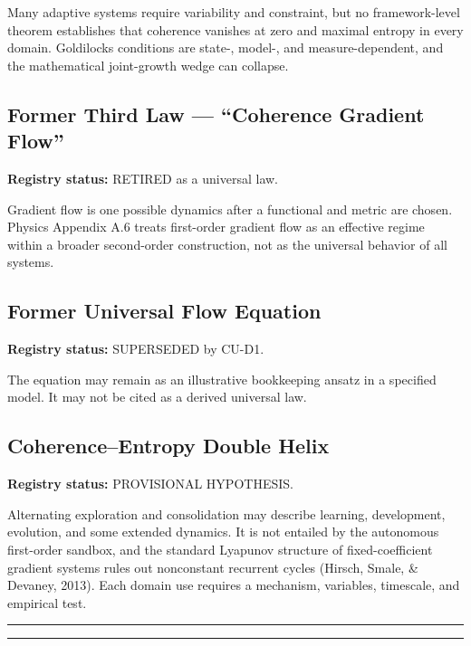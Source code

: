 \documentclass[
  11pt,
]{article}
\begin{document}
Many adaptive systems require variability and constraint, but no
framework-level theorem establishes that coherence vanishes at zero and
maximal entropy in every domain. Goldilocks conditions are state-,
model-, and measure-dependent, and the mathematical joint-growth wedge
can collapse.

\subsection{Former Third Law --- ``Coherence Gradient
Flow''}\label{former-third-law-coherence-gradient-flow}

\textbf{Registry status:} RETIRED as a universal law.

Gradient flow is one possible dynamics after a functional and metric are
chosen. Physics Appendix A.6 treats first-order gradient flow as an
effective regime within a broader second-order construction, not as the
universal behavior of all systems.

\subsection{Former Universal Flow
Equation}\label{former-universal-flow-equation}

\textbf{Registry status:} SUPERSEDED by CU-D1.

The equation may remain as an illustrative bookkeeping ansatz in a
specified model. It may not be cited as a derived universal law.

\subsection{Coherence--Entropy Double
Helix}\label{coherenceentropy-double-helix}

\textbf{Registry status:} PROVISIONAL HYPOTHESIS.

Alternating exploration and consolidation may describe learning,
development, evolution, and some extended dynamics. It is not entailed
by the autonomous first-order sandbox, and the standard Lyapunov
structure of fixed-coefficient gradient systems rules out nonconstant
recurrent cycles (Hirsch, Smale, \& Devaney, 2013). Each domain use
requires a mechanism, variables, timescale, and empirical test.

\begin{center}\rule{0.5\linewidth}{0.5pt}\end{center}

\begin{center}\rule{0.5\linewidth}{0.5pt}\end{center}
\end{document}
